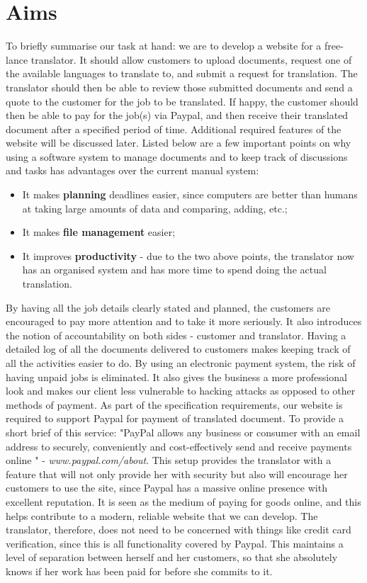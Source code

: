 \documentclass{l3proj}
\begin{document}
\section{Aims}
To briefly summarise our task at hand: we are to develop a website for a
free-lance translator. It should allow customers to upload documents, request
one of the available languages to translate to, and submit a request for
translation. The translator should then be able to review those submitted
documents and send a quote to the customer for the job to be translated. If
happy, the customer should then be able to pay for the job(s) via Paypal, and
then receive their translated document after a specified period of time.
Additional required features of the website will be discussed later. Listed
below are a few important points on why using a software system to manage
documents and to keep track of discussions and tasks has advantages over the
current manual system:

\begin{itemize}
	\item
	It makes {\bf planning} deadlines easier, since computers are better than humans
	at taking large amounts of data and comparing, adding, etc.;
	\item
	It makes {\bf file management} easier;
	\item
	It improves {\bf productivity} - due to the two above points, the
translator now has an organised system and has more time to spend doing the
actual translation.
\end{itemize}

By having all the job details clearly stated and planned, the customers are
encouraged to pay more attention and to take it more seriously. It also
introduces the notion of accountability on both sides - customer and translator.
Having a detailed log of all the documents delivered to customers makes keeping
track of all the activities easier to do. By using an electronic payment system,
the risk of having unpaid jobs is eliminated. It also gives the business a more
professional look and makes our client less vulnerable to hacking attacks as
opposed to other methods of payment. As part of the specification requirements,
our website is required to support Paypal for payment of translated document. To
provide a short brief of this service: "PayPal allows any business or consumer
with an email address to securely, conveniently and cost-effectively send and
receive payments online " - \textit{\small{www.paypal.com/about}}. This setup
provides the translator with a feature that will not only provide her with
security but also will encourage her customers to use the site, since Paypal has
a massive online presence with excellent reputation. It is seen as the medium of
paying for goods online, and this helps contribute to a modern, reliable website
that we can develop. The translator, therefore, does not need to be concerned
with things like credit card verification, since this is all functionality
covered by Paypal. This maintains a level of separation between herself and her
customers, so that she absolutely knows if her work has been paid for before she
commits to it. \\
\end{document}
